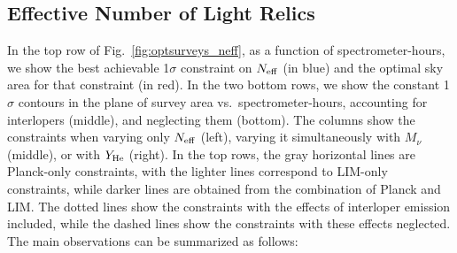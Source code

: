 \documentclass[twocolumn]{aastex631}
\begin{document}
\subsection{Effective Number of Light Relics}
In the top row of Fig.~\ref{fig:optsurveys_neff}, as a function of spectrometer-hours, we show the best achievable 1$\sigma$ constraint on $N_{\rm eff}$ (in blue) and the optimal sky area for that constraint (in red). In the two bottom rows, we show the constant 1$\sigma$ contours in the plane of survey area vs.\ spectrometer-hours, accounting for interlopers (middle), and neglecting them (bottom). The columns show the constraints when varying only $N_{\rm eff}$ (left), varying it simultaneously with $M_\nu$ (middle), or with $Y_{\rm He}$ (right). In the top rows, the gray horizontal lines are Planck-only constraints, with the lighter lines correspond to LIM-only constraints, while darker lines are obtained from the combination of Planck and LIM. The dotted lines show the constraints with the effects of interloper emission included, while the dashed lines show the constraints with these effects neglected. The main observations can be summarized as follows: 
\end{document}
